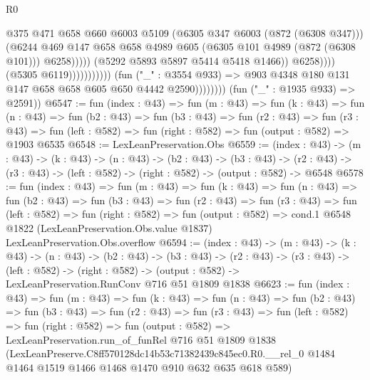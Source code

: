 \begin{lexlean}{R0}
\begin{coremodule}
                                                          @375
                                                          @471
                                                          @658
                                                          @660
                                                          @6003
                                                          @5109
                                                          (@6305 @347 @6003 (@872 (@6308 @347)))
                                                          (@6244
                                                            @469
                                                            @147
                                                            @658
                                                            @658
                                                            @4989
                                                            @605
                                                            (@6305 @101 @4989 (@872 (@6308 @101)))
                                                            @6258)))))
                                                  (@5292 @5893 @5897 @5414 @5418 @1466))
                                                @6258))))
                                        (@5305 @6119)))))))))))
                    (fun ("_" : @3554 @933) =>
                    @903 @4348 @180 @131 @147 @658 @658 @605 @650 @4442 @2590))))))))
      (fun ("_" : @1935 @933) => @2591))
@6547 := fun (index : @43) =>
  fun (m : @43) =>
  fun (k : @43) =>
  fun (n : @43) =>
  fun (b2 : @43) =>
  fun (b3 : @43) =>
  fun (r2 : @43) =>
  fun (r3 : @43) => fun (left : @582) => fun (right : @582) => fun (output : @582) => @1903 @6535
@6548 := LexLeanPreservation.Obs
@6559 := (index : @43) ->
  (m : @43) ->
  (k : @43) ->
  (n : @43) ->
  (b2 : @43) ->
  (b3 : @43) ->
  (r2 : @43) -> (r3 : @43) -> (left : @582) -> (right : @582) -> (output : @582) -> @6548
@6578 := fun (index : @43) =>
  fun (m : @43) =>
  fun (k : @43) =>
  fun (n : @43) =>
  fun (b2 : @43) =>
  fun (b3 : @43) =>
  fun (r2 : @43) =>
  fun (r3 : @43) =>
  fun (left : @582) =>
  fun (right : @582) =>
  fun (output : @582) =>
  cond.{1} @6548 @1822 (LexLeanPreservation.Obs.value @1837) LexLeanPreservation.Obs.overflow
@6594 := (index : @43) ->
  (m : @43) ->
  (k : @43) ->
  (n : @43) ->
  (b2 : @43) ->
  (b3 : @43) ->
  (r2 : @43) ->
  (r3 : @43) ->
  (left : @582) ->
  (right : @582) -> (output : @582) -> LexLeanPreservation.RunConv @716 @51 @1809 @1838
@6623 := fun (index : @43) =>
  fun (m : @43) =>
  fun (k : @43) =>
  fun (n : @43) =>
  fun (b2 : @43) =>
  fun (b3 : @43) =>
  fun (r2 : @43) =>
  fun (r3 : @43) =>
  fun (left : @582) =>
  fun (right : @582) =>
  fun (output : @582) =>
  LexLeanPreservation.run_of_funRel
    @716
    @51
    @1809
    @1838
    (LexLeanPreserve.C8ff570128dc14b53c71382439c845ec0.R0.__rel_0
      @1484
      @1464
      @1519
      @1466
      @1468
      @1470
      @910
      @632
      @635
      @618
      @589)
\end{coremodule}
\end{lexlean}

